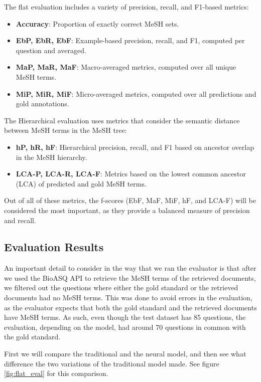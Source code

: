 \documentclass[12pt]{article}
\begin{document}
The flat evaluation includes a variety of precision, recall, and F1-based metrics:
\begin{itemize}
  \item \textbf{Accuracy}: Proportion of exactly correct MeSH sets.
  \item \textbf{EbP, EbR, EbF}: Example-based precision, recall, and F1, computed per question and averaged.
  \item \textbf{MaP, MaR, MaF}: Macro-averaged metrics, computed over all unique MeSH terms.
  \item \textbf{MiP, MiR, MiF}: Micro-averaged metrics, computed over all predictions and gold annotations.
\end{itemize}

The Hierarchical evaluation uses metrics that consider the semantic distance between MeSH terms in the MeSH tree:
\begin{itemize}
  \item \textbf{hP, hR, hF}: Hierarchical precision, recall, and F1 based on ancestor overlap in the MeSH hierarchy.
  \item \textbf{LCA-P, LCA-R, LCA-F}: Metrics based on the lowest common ancestor (LCA) of predicted and gold MeSH terms.
\end{itemize}

Out of all of these metrics, the f-scores (EbF, MaF, MiF, hF, and LCA-F) will be considered the most important, as they provide a balanced measure of precision and recall.

\subsection{Evaluation Results}
An important detail to consider in the way that we ran the evaluator is that after we used the BioASQ API to retrieve the MeSH terms of the retrieved documents, we filtered out the questions where either the gold standard or the retrieved documents had no MeSH terms. This was done to avoid errors in the evaluation, as the evaluator expects that both the gold standard and the retrieved documents have MeSH terms. As such, even though the test dataset has 85 questions, the evaluation, depending on the model, had around 70 questions in common with the gold standard.

First we will compare the traditional and the neural model, and then see what difference the two variations of the traditional model made. See figure \ref{fig:flat_eval} for this comparison. 
\end{document}
